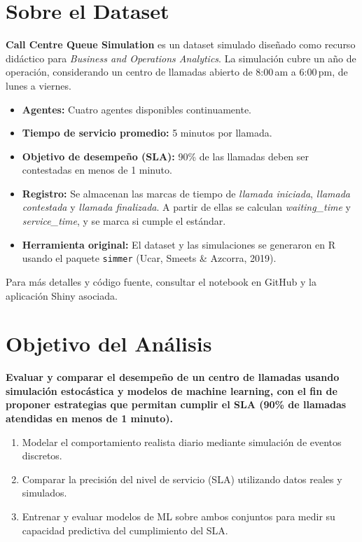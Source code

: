 \documentclass[12pt]{article}
\begin{document}
\section{Sobre el Dataset}
\textbf{Call Centre Queue Simulation} es un dataset simulado diseñado como recurso didáctico para \emph{Business and Operations Analytics}.  
La simulación cubre un año de operación, considerando un centro de llamadas abierto de 8:00\,am a 6:00\,pm, de lunes a viernes.  
\begin{itemize}
  \item \textbf{Agentes:} Cuatro agentes disponibles continuamente.
  \item \textbf{Tiempo de servicio promedio:} 5 minutos por llamada.
  \item \textbf{Objetivo de desempeño (SLA):} 90\% de las llamadas deben ser contestadas en menos de 1 minuto.
  \item \textbf{Registro:} Se almacenan las marcas de tiempo de \emph{llamada iniciada}, \emph{llamada contestada} y \emph{llamada finalizada}. A partir de ellas se calculan \emph{waiting\_time} y \emph{service\_time}, y se marca si cumple el estándar.
  \item \textbf{Herramienta original:} El dataset y las simulaciones se generaron en R usando el paquete \texttt{simmer} (Ucar, Smeets \& Azcorra, 2019).
\end{itemize}
Para más detalles y código fuente, consultar el notebook en GitHub y la aplicación Shiny asociada.

\section{Objetivo del Análisis}
\textbf{Evaluar y comparar el desempeño de un centro de llamadas usando simulación estocástica y modelos de machine learning, con el fin de proponer estrategias que permitan cumplir el SLA (90\% de llamadas atendidas en menos de 1 minuto).}
\begin{enumerate}
  \item Modelar el comportamiento realista diario mediante simulación de eventos discretos.
  \item Comparar la precisión del nivel de servicio (SLA) utilizando datos reales y simulados.
  \item Entrenar y evaluar modelos de ML sobre ambos conjuntos para medir su capacidad predictiva del cumplimiento del SLA.
\end{enumerate}
\end{document}
